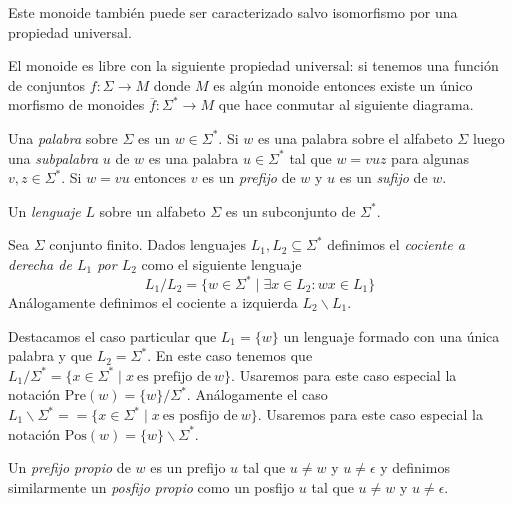 \documentclass[tesis.tex]{subfiles}
\begin{document}
Este monoide también puede ser caracterizado salvo isomorfismo por una propiedad universal.

\begin{obs}
	El monoide es libre con la siguiente propiedad universal: si tenemos una función de conjuntos $f: \Sigma \to M$ donde $M$ es algún monoide entonces existe un único morfismo de monoides $\overline f: \Sigma^{*} \to M$ que hace conmutar al siguiente diagrama.	
	
	\begin{center}
	\end{center}
	
\end{obs}

Una \emph{palabra} sobre $\Sigma$ es un $w \in \Sigma^*$.
Si $w $ es una palabra sobre el alfabeto $\Sigma$ luego una \emph{subpalabra} $u$ de $w$ es una palabra $u \in \Sigma^*$ tal que $w = vuz$ para algunas $v, z \in \Sigma^*$. 
Si $w = vu$ entonces $v$ es un \emph{prefijo} de $w$ y $u$ es un \emph{sufijo} de $w$.


\begin{deff}
	Un \emph{lenguaje} $L$ sobre un alfabeto $\Sigma$ es un subconjunto de $\Sigma^*$.
\end{deff}

\begin{deff}
	Sea $\Sigma$ conjunto finito.
	Dados lenguajes $L_{1}, L_{2} \subseteq \Sigma^*$ definimos el \emph{cociente a derecha de $L_{1}$ por $L_{2}$} como el siguiente lenguaje
	\[
	L_{1}/L_{2} = \{ w \in \Sigma^* \mid \exists x \in L_{2}: wx \in L_{1}    \}
	\]
	Análogamente definimos el cociente a izquierda $L_{2} \backslash L_{1}$.
\end{deff}
Destacamos el caso particular que $L_{1} = \{w\}$ un lenguaje formado con una única palabra y que $L_{2} = \Sigma^*$.
En este caso tenemos que $L_{1}/\Sigma^* = \{  x \in \Sigma^*  \mid x \ \text{es prefijo de} \ w  \}$.
Usaremos para este caso especial la notación $ \text{Pre}(w) = \{w\}/\Sigma^*$.
Análogamente el caso $L_{1} \backslash \Sigma^{*} = = \{  x \in \Sigma^*  \mid x \ \text{es posfijo de} \ w  \}$.
Usaremos para este caso especial la notación $ \text{Pos}(w) = \{w\} \backslash \Sigma^*$.


Un \emph{prefijo propio} de $w$ es un prefijo $u$ tal que $u \neq w$ y $u \neq \epsilon$ y definimos similarmente un \emph{posfijo propio} como un posfijo $u$ tal que $u \neq w$ y $u \neq \epsilon$.
\end{document}

